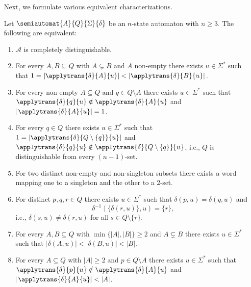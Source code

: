 Next, we formulate various equivalent characterizations.

\begin{theorem}
	\label{sync_max:thm:char_distinguishable}
	Let $\semiautomat{A}{Q}{\Sigma}{\delta}$ be an $n$-state automaton
	with $n \ge 3$.
	The following are equivalent:
	\begin{enumerate}
		\item \label{dist:item:all_pairs}
		$\mathcal A$ is completely distinguishable.
		
		\item \label{dist:item:subsets} 
		For every $A, B \subseteq Q$
		with $A \subsetneq B$ and $A$ non-empty
		there exists $u \in \Sigma^*$
		such that $1 = |\applytrans{\delta}{A}{u}| < |\applytrans{\delta}{B}{u}|$.
		
		\item \label{dist:item:subset_single_point} For every non-empty $A \subseteq Q$ and $q \in Q \setminus A$ there exists $u \in \Sigma^*$ 
		such that $\applytrans{\delta}{q}{u} \notin \applytrans{\delta}{A}{u}$
		and $|\applytrans{\delta}{A}{u}| = 1$.		
						
		\item \label{dist:item:single_point} For every $q \in Q$ there exists $u \in \Sigma^*$ such that
		$1 = |\applytrans{\delta}{Q \setminus \{q\}}{u}|$ and $\applytrans{\delta}{q}{u} \notin \applytrans{\delta}{Q \setminus \{q\}}{u}$, i.e., $Q$ is distinguishable from every $(n-1)$-set.
		
		\item \label{dist:item:one-two-set} For two distinct non-empty and non-singleton subsets
		there exists a word mapping one to a singleton and the other to a $2$-set.
					
		\item \label{dist:item:pqr-r-one-lane} For distinct $p,q,r \in Q$ there exists $u \in \Sigma^*$ 
		such that $\delta(p, u) = \delta(q, u)$ and 
		\[
		\delta^{-1}(\{\delta(r,u)\}, u) = \{r\},
		\] i.e.,
		$\delta(s, u) \ne \delta(r, u)$ for all $s \in Q \setminus \{r\}$.
		
		\item \label{dist:item:compress-two-sets} For every $A, B \subseteq Q$ with $\min\{|A|, |B|\} \ge 2$
		and $A \subsetneq B$ there exists $u \in \Sigma^*$ such that $|\delta(A, u)| < |\delta(B, u)| < |B|$.		
				
		\item \label{dist:item:compress} For every $A \subseteq Q$
		with $|A| \ge 2$ and $p \in Q \setminus A$
		there exists $u \in \Sigma^*$
		such that $\applytrans{\delta}{p}{u} \notin \applytrans{\delta}{A}{u}$
		and $|\applytrans{\delta}{A}{u}| < |A|$. 
				

\end{enumerate}
\end{theorem}
